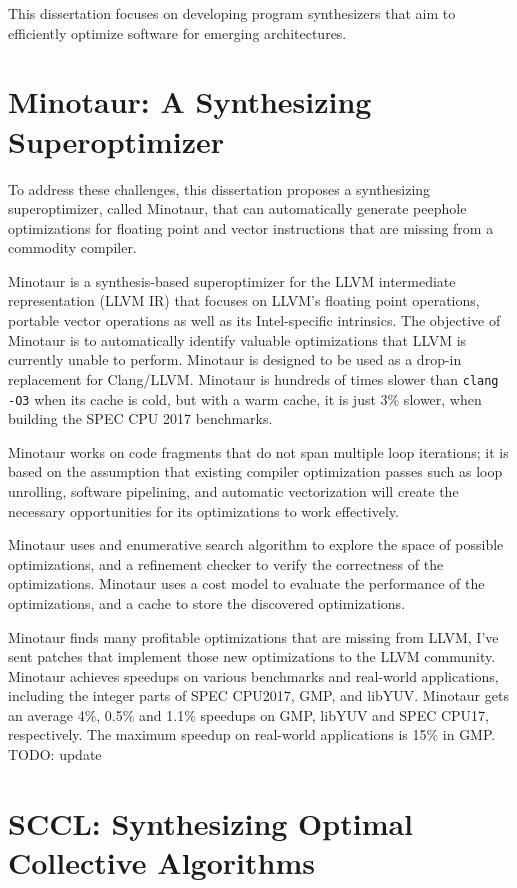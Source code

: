 This dissertation focuses on developing program synthesizers that aim
to efficiently optimize software for emerging architectures.


\section{Minotaur: A Synthesizing Superoptimizer}

To address these challenges, this dissertation proposes a synthesizing
superoptimizer, called Minotaur, that can automatically generate
peephole optimizations for floating point and vector instructions that
are missing from a commodity compiler.

Minotaur is a synthesis-based superoptimizer for the LLVM intermediate
representation (LLVM IR) that focuses on LLVM's floating point operations,
portable vector operations as well as its Intel-specific intrinsics.
The objective of Minotaur is to automatically identify valuable
optimizations that LLVM is currently unable to perform.
Minotaur is designed to be used as a drop-in replacement for Clang/LLVM.
Minotaur is hundreds of times slower than \texttt{clang -O3} when its
cache is cold, but with a warm cache, it is just 3\% slower, when
building the SPEC CPU 2017 benchmarks.

Minotaur works on code fragments that do not span multiple loop
iterations; it is based on the assumption that existing compiler
optimization passes such as loop unrolling, software pipelining, and
automatic vectorization will create the necessary opportunities for
its optimizations to work effectively.

Minotaur uses and enumerative search algorithm to explore the space of
possible optimizations, and a refinement checker to verify the
correctness of the optimizations.
Minotaur uses a cost model to evaluate the performance of the
optimizations, and a cache to store the discovered optimizations.

Minotaur finds many profitable optimizations that are missing from
LLVM, I've sent patches that implement those new optimizations to the
LLVM community. Minotaur achieves speedups on various benchmarks and
real-world applications, including the integer parts of SPEC CPU2017,
GMP, and libYUV. Minotaur gets an average 4\%, 0.5\% and 1.1\% speedups
on GMP, libYUV and SPEC CPU17, respectively. The maximum speedup on
real-world applications is 15\% in GMP. TODO: update

\section{SCCL: Synthesizing Optimal Collective Algorithms}

